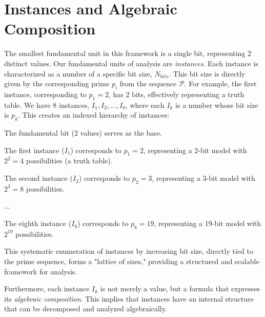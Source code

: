\section{Instances and Algebraic Composition}
The smallest fundamental unit in this framework is a single bit, representing 2 distinct values. Our fundamental units of analysis are \textit{instances}. Each instance is characterized as a number of a specific bit size, $N_{bits}$. This bit size is directly given by the corresponding prime $p_i$ from the sequence $\mathcal{P}$. For example, the first instance, corresponding to $p_1=2$, has 2 bits, effectively representing a truth table. We have 8 instances, $I_1, I_2, \ldots, I_8$, where each $I_k$ is a number whose bit size is $p_k$. This creates an indexed hierarchy of instances:
\begin{itemize}
    
The fundamental bit (2 values) serves as the base.
    
The first instance ($I_1$) corresponds to $p_1=2$, representing a 2-bit model with $2^2=4$ possibilities (a truth table).
    
The second instance ($I_2$) corresponds to $p_2=3$, representing a 3-bit model with $2^3=8$ possibilities.
    
    ... 
    
The eighth instance ($I_8$) corresponds to $p_8=19$, representing a 19-bit model with $2^{19}$ possibilities.
\end{itemize}
This systematic enumeration of instances by increasing bit size, directly tied to the prime sequence, forms a "lattice of sizes," providing a structured and scalable framework for analysis.

Furthermore, each instance $I_k$ is not merely a value, but a formula that expresses its \textit{algebraic composition}. This implies that instances have an internal structure that can be decomposed and analyzed algebraically.
